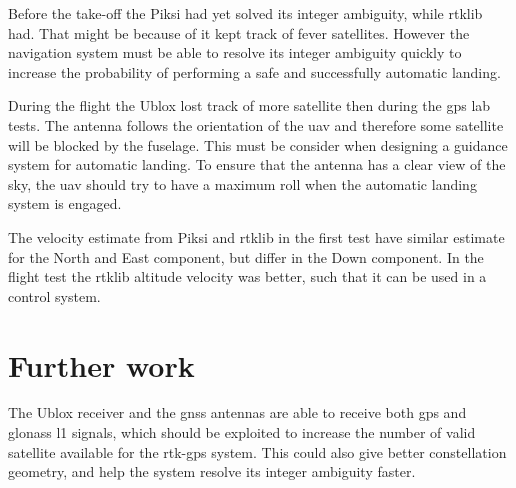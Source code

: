 Before the take-off the Piksi had yet solved its integer ambiguity, while \gls{rtklib} had. That might be because of it kept track of fever satellites. However the navigation system must be able to resolve its integer ambiguity quickly to increase the probability of performing a safe and successfully automatic landing.

During the flight the Ublox lost track of more satellite then during the \gls{gps} lab tests. The antenna follows the orientation of the \gls{uav} and therefore some satellite will be blocked by the fuselage. This must be consider when designing a guidance system for automatic landing. To ensure that the antenna has a clear view of the sky, the \gls{uav} should try to have a maximum roll when the automatic landing system is engaged.

The velocity estimate from Piksi and \gls{rtklib} in the first test have similar estimate for the North and East component, but differ in the Down component. In the flight test the \gls{rtklib} altitude velocity was better, such that it can be used in a control system.
%
%
%
%
%
%
%
%
%
%
%
%
%
%
%
%
%


\section{Further work}
The Ublox receiver and the \gls{gnss} antennas are able to receive both \gls{gps} and \gls{glonass} \gls{l1} signals, which should be exploited to increase the number of valid satellite available for the \gls{rtk-gps} system. This could also give better constellation geometry, and help the system resolve its integer ambiguity faster.

